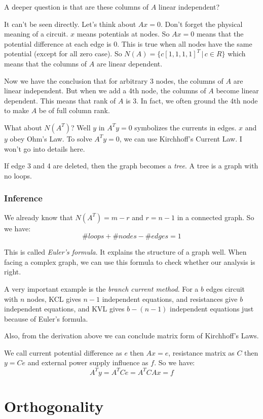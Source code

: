 \documentclass[10pt,a4paper,oneside,numbers=noenddot]{scrbook}
\theoremstyle{ctplain}
\theoremstyle{ctresult}
\begin{document}
A deeper question is that are these columns of $A$ linear independent?

It can't be seen directly. Let's think about $Ax = 0$. Don't forget the physical meaning of
a circuit. $x$ means potentials at nodes. So $Ax = 0$ means that the potential
difference at each edge is 0. This is true when all nodes have the same potential (except for
all zero case). So $N(A) = \{c[1, 1, 1, 1]^T \,|\, c \in R\}$ which means that the columns of
$A$ are linear dependent.

Now we have the conclusion that for arbitrary 3 nodes, the columns of $A$ are linear
independent. But when we add a 4th node, the columns of $A$ become linear dependent.
This means that rank of $A$ is 3. In fact, we often ground the 4th node to make $A$ be of
full column rank.

What about $N(A^{T})$? Well $y$ in $A^{T}y = 0$ symbolizes the currents in edges. $x$ and
$y$ obey Ohm's Law. To solve $A^{T}y = 0$, we can use Kirchhoff's Current Law. I won't
go into details here.

If edge 3 and 4 are deleted, then the graph becomes a \emph{tree}. A tree is a graph
with no loops.

\subsection{Inference}

We already know that $N(A^{T}) = m - r$ and $r = n - 1$ in a connected graph. So we have:
\[
  \# loops + \# nodes - \# edges = 1
\]

This is called \emph{Euler's formula}. It explains the structure of a graph well. When
facing a complex graph, we can use this formula to check whether our analysis is right.

A very important example is the \emph{branch current method}. For a $b$ edges circuit with
$n$ nodes, KCL gives $n - 1$ independent equations, and resistances give $b$ independent
equations, and KVL gives $b - (n - 1)$ independent equations just because of Euler's formula.

Also, from the derivation above we can conclude matrix form of Kirchhoff's Laws.

We call current potential difference as $e$ then $Ax = e$, resistance matrix as $C$ then
$y = Ce$ and external power supply influence as $f$. So we have:
\[
  A^{T}y = A^{T}Ce = A^{T}CAx = f
\]

\chapter{Orthogonality}
\end{document}
